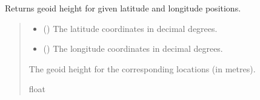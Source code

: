 \documentclass[letterpaper,10pt,english]{sphinxmanual}
\begin{document}
\begin{fulllineitems}
\begin{fulllineitems}
\label{\detokenize{modules/earth/geoid:qnav.earth.geoid.GeoidModel.get_height_vec}}
\pysigstartsignatures
{}
\pysigstopsignatures
\sphinxAtStartPar
Returns geoid height for given latitude and longitude positions.
\begin{quote}\begin{description}
\begin{itemize}
\item {} 
\sphinxAtStartPar
{} () \textendash{} The latitude coordinates in decimal degrees.

\item {} 
\sphinxAtStartPar
{} () \textendash{} The longitude coordinates in decimal degrees.

\end{itemize}

\sphinxAtStartPar
The geoid height for the corresponding locations (in metres).

\sphinxAtStartPar
float

\end{description}\end{quote}

\end{fulllineitems}



\end{fulllineitems}
\end{document}

